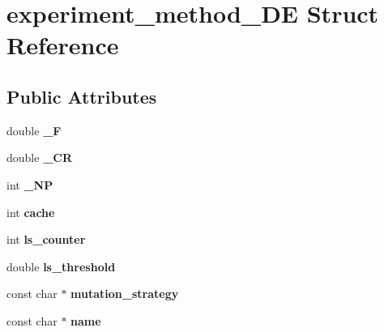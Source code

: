 \hypertarget{structexperiment__method__DE}{\section{experiment\-\_\-method\-\_\-\-D\-E Struct Reference}
\label{structexperiment__method__DE}
}
\subsection*{Public Attributes}
\begin{DoxyCompactItemize}
\item 
\hypertarget{structexperiment__method__DE_ad8f8a306110bb8728fd4f92f245bb67a}{double {\bfseries \-\_\-\-F}}\label{structexperiment__method__DE_ad8f8a306110bb8728fd4f92f245bb67a}

\item 
\hypertarget{structexperiment__method__DE_aeb8edfa64cba067866642f0c82de4039}{double {\bfseries \-\_\-\-C\-R}}\label{structexperiment__method__DE_aeb8edfa64cba067866642f0c82de4039}

\item 
\hypertarget{structexperiment__method__DE_af1189457a2006567cd316d44598d166b}{int {\bfseries \-\_\-\-N\-P}}\label{structexperiment__method__DE_af1189457a2006567cd316d44598d166b}

\item 
\hypertarget{structexperiment__method__DE_a68df0f953d501126cd6e767fa90826b7}{int {\bfseries cache}}\label{structexperiment__method__DE_a68df0f953d501126cd6e767fa90826b7}

\item 
\hypertarget{structexperiment__method__DE_ae60c1d58ac60dcbe21af0ea47fefbe8b}{int {\bfseries ls\-\_\-counter}}\label{structexperiment__method__DE_ae60c1d58ac60dcbe21af0ea47fefbe8b}

\item 
\hypertarget{structexperiment__method__DE_af1144a16e19c850f0647502148d0c702}{double {\bfseries ls\-\_\-threshold}}\label{structexperiment__method__DE_af1144a16e19c850f0647502148d0c702}

\item 
\hypertarget{structexperiment__method__DE_afc49222f2e7fe6353ff2f4081611fb46}{const char $\ast$ {\bfseries mutation\-\_\-strategy}}\label{structexperiment__method__DE_afc49222f2e7fe6353ff2f4081611fb46}

\item 
\hypertarget{structexperiment__method__DE_a505463ccba9628917d0d526d676755b6}{const char $\ast$ {\bfseries name}}\label{structexperiment__method__DE_a505463ccba9628917d0d526d676755b6}


\end{DoxyCompactItemize}
